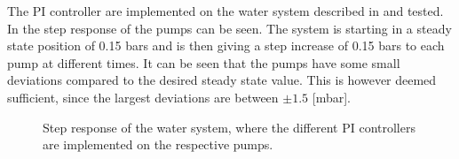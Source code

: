 The PI controller are implemented on the water system described in  and tested. In  the step response of the pumps can be seen. The system is starting in a steady state position of 0.15 bars and is then giving a step increase of 0.15 bars to each pump at different times. It can be seen that the pumps have some small deviations compared to the desired steady state value. This is however deemed sufficient, since the largest deviations are between $\pm 1.5$ [mbar].

\begin{figure}[H]
\centering

\caption{Step response of the water system, where the different PI controllers are implemented on the respective pumps.}
\label{fig:Tikz_PI_PUMP_GAINNNN}
\end{figure}





% 


% 


